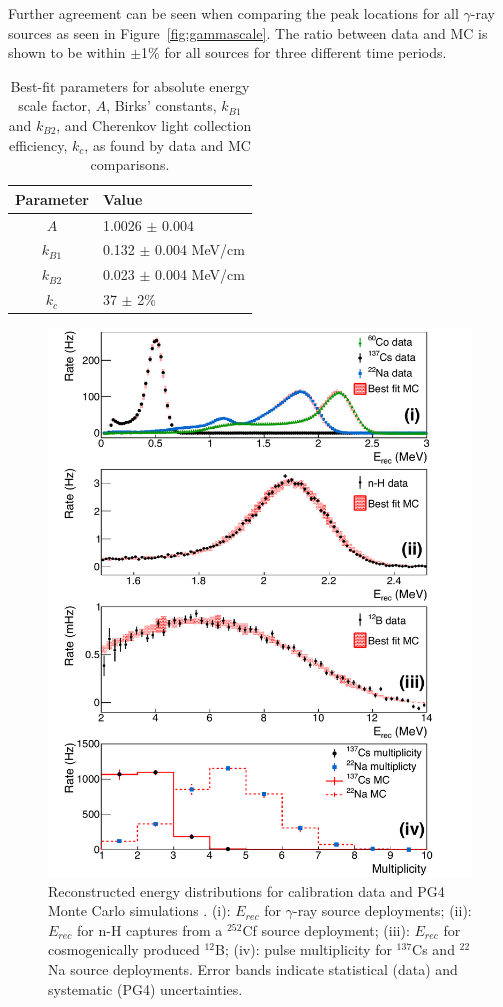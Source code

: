 Further agreement can be seen when comparing the peak locations for all $\gamma$-ray sources as seen in Figure~\ref{fig:gammascale}. The ratio between data and MC is shown to be within $\pm$1\% for all sources for three different time periods.

\begin{table}
	\centering
\begin{tabular}{c|l}
	\hline 
	\textbf{Parameter} & \textbf{Value} \\ 
	\hline 
	$A$ & 1.0026 $\pm$ 0.004 \\ 
	$k_{B1}$ & 0.132 $\pm$ 0.004 MeV/cm \\ 
	$k_{B2}$ & 0.023 $\pm$ 0.004 MeV/cm \\ 
	$k_c$ & 37 $\pm$ 2\% \\ 
	\hline 
\end{tabular} 
\caption{Best-fit parameters for absolute energy scale factor, $A$, Birks' constants, $k_{B1}$ and $k_{B2}$, and Cherenkov light collection efficiency, $k_c$, as found by data and MC comparisons.}
\label{tab:MCValues}
\end{table}


\begin{figure}[h]
	\centering
	\includegraphics[width=0.7\linewidth]{tex/5-analysis-images/GammaE}
	\caption[MC-data comparison of reconstructed energy]{Reconstructed energy distributions for calibration data and PG4 Monte Carlo simulations \cite{XZhang:2815}. (i): $E_{rec}$ for $\gamma$-ray source deployments; (ii): $E_{rec}$ for n-H captures from a $^{252}$Cf source deployment; (iii): $E_{rec}$ for cosmogenically produced $^{12}$B; (iv): pulse multiplicity for $^{137}$Cs and $^{22}$Na source deployments. Error bands indicate statistical (data) and systematic (PG4) uncertainties.}
	\label{fig:gammae}
\end{figure}

